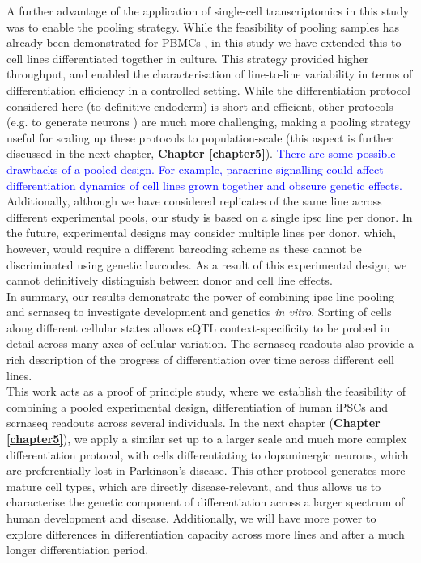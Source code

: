 A further advantage of the application of single-cell transcriptomics in this study was to enable the pooling strategy. 
While the feasibility of pooling samples has already been demonstrated for PBMCs \cite{kang2018multiplexed}, in this study we have extended this to cell lines differentiated together in culture. 
This strategy provided higher throughput, and enabled the characterisation of line-to-line variability in terms of differentiation efficiency in a controlled setting. 
While the differentiation protocol considered here (to definitive endoderm) is short and efficient, other protocols (e.g. to generate neurons \cite{tao2016neural}) are much more challenging, making a pooling strategy useful for scaling up these protocols to population-scale (this aspect is further discussed in the next chapter, \textbf{Chapter \ref{chapter5}}).
\textcolor{blue}{There are some possible drawbacks of a pooled design. 
For example, paracrine signalling \cite{muller2016distinguishing} could affect differentiation dynamics of cell lines grown together and obscure genetic effects.} Additionally, although we have considered replicates of the same line across different experimental pools, our study is based on a single \gls{ipsc} line per donor. 
In the future, experimental designs may consider multiple lines per donor, which, however, would require a different barcoding scheme as these cannot be discriminated
using genetic barcodes. 
As a result of this experimental design, we cannot definitively distinguish between donor and cell line effects.\\

In summary, our results demonstrate the power of combining \gls{ipsc} line pooling and \gls{scrnaseq} to investigate development and genetics \textit{in vitro}. 
Sorting of cells along different cellular states allows eQTL  context-specificity to be probed in detail across many axes of cellular variation. 
The \gls{scrnaseq} readouts also provide a rich description of the progress of differentiation over time across different cell lines. \\

This work acts as a proof of principle study, where we establish the feasibility of combining a pooled experimental design, differentiation of human iPSCs and \gls{scrnaseq} readouts across several individuals.
In the next chapter (\textbf{Chapter 
\ref{chapter5}}),
we apply a similar set up to a larger scale and much more complex differentiation protocol, with cells differentiating to dopaminergic neurons, which are preferentially lost in Parkinson's disease.
This other protocol generates more mature cell types, which are directly disease-relevant, and thus allows us to characterise the genetic component of differentiation across a larger spectrum of human development and disease.
Additionally, we will have more power to explore differences in differentiation capacity across more lines and after a much longer differentiation period.

